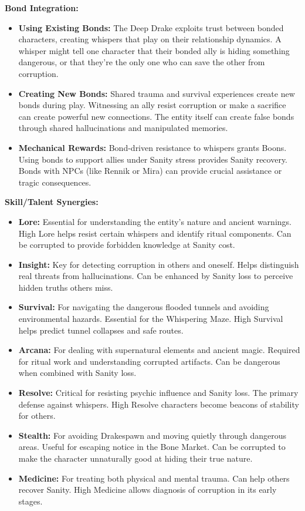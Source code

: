 \documentclass[11pt]{article}
\begin{document}
\textbf{Bond Integration:}
\begin{itemize}
\item \textbf{Using Existing Bonds:} The Deep Drake exploits trust between bonded characters, creating whispers that play on their relationship dynamics. A whisper might tell one character that their bonded ally is hiding something dangerous, or that they're the only one who can save the other from corruption.
\item \textbf{Creating New Bonds:} Shared trauma and survival experiences create new bonds during play. Witnessing an ally resist corruption or make a sacrifice can create powerful new connections. The entity itself can create false bonds through shared hallucinations and manipulated memories.
\item \textbf{Mechanical Rewards:} Bond-driven resistance to whispers grants Boons. Using bonds to support allies under Sanity stress provides Sanity recovery. Bonds with NPCs (like Rennik or Mira) can provide crucial assistance or tragic consequences.
\end{itemize}

\textbf{Skill/Talent Synergies:}
\begin{itemize}
\item \textbf{Lore:} Essential for understanding the entity's nature and ancient warnings. High Lore helps resist certain whispers and identify ritual components. Can be corrupted to provide forbidden knowledge at Sanity cost.
\item \textbf{Insight:} Key for detecting corruption in others and oneself. Helps distinguish real threats from hallucinations. Can be enhanced by Sanity loss to perceive hidden truths others miss.
\item \textbf{Survival:} For navigating the dangerous flooded tunnels and avoiding environmental hazards. Essential for the Whispering Maze. High Survival helps predict tunnel collapses and safe routes.
\item \textbf{Arcana:} For dealing with supernatural elements and ancient magic. Required for ritual work and understanding corrupted artifacts. Can be dangerous when combined with Sanity loss.
\item \textbf{Resolve:} Critical for resisting psychic influence and Sanity loss. The primary defense against whispers. High Resolve characters become beacons of stability for others.
\item \textbf{Stealth:} For avoiding Drakespawn and moving quietly through dangerous areas. Useful for escaping notice in the Bone Market. Can be corrupted to make the character unnaturally good at hiding their true nature.
\item \textbf{Medicine:} For treating both physical and mental trauma. Can help others recover Sanity. High Medicine allows diagnosis of corruption in its early stages.
\end{itemize}
\end{document}
